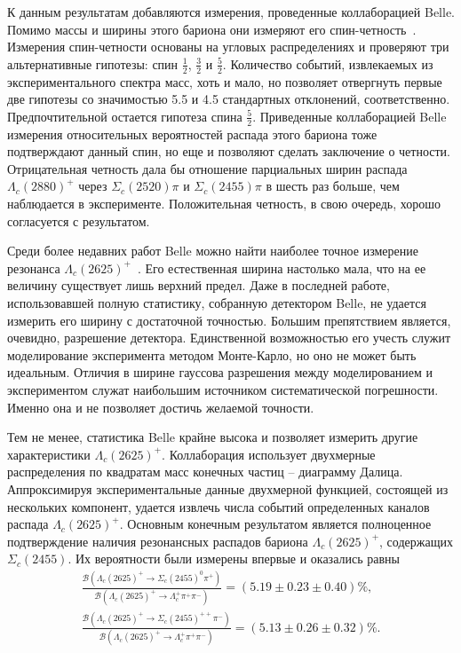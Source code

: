 \documentclass[a4paper, 12pt]{article}
\def\Lc{\Lambda_c^+}
\def\ScIz{\Sigma_c(2455)^0}
\def\ScIpp{\Sigma_c(2455)^{++}}
\def\ScI{\Sigma_c(2455)}
\def\ScII{\Sigma_c(2520)}
\def\LcII{\Lambda_c(2625)^+}
\def\LcIII{\Lambda_c(2880)^+}
\def\pip{\pi^+}
\def\pim{\pi^-}
\begin{document}
К данным результатам добавляются измерения, проведенные коллаборацией 
Belle. Помимо массы и ширины этого бариона они измеряют его 
спин-четность~\cite{4-belle-lc}. Измерения спин-четности основаны на 
угловых распределениях и проверяют три альтернативные гипотезы: спин 
$\frac{1}{2}$, $\frac{3}{2}$ и $\frac{5}{2}$. Количество событий, 
извлекаемых из экспериментального спектра масс, хоть и мало, но 
позволяет отвергнуть первые две гипотезы со значимостью 5.5 и 4.5 
стандартных отклонений, соответственно. Предпочтительной остается 
гипотеза спина $\frac{5}{2}$. Приведенные коллаборацией Belle измерения 
относительных вероятностей распада этого бариона тоже подтверждают 
данный спин, но еще и позволяют сделать заключение о четности. 
Отрицательная четность дала бы отношение парциальных ширин распада 
$\LcIII$ через $\ScII\pi$ и $\ScI\pi$ в шесть раз больше, чем 
наблюдается в эксперименте. Положительная четность, в свою очередь, 
хорошо согласуется с результатом.

Среди более недавних работ Belle можно найти наиболее точное измерение 
резонанса $\LcII$~\cite{5-belle-lc}. Его естественная ширина настолько 
мала, что на ее величину существует лишь верхний предел. Даже 
в последней работе, использовавшей полную статистику, собранную 
детектором Belle, не удается измерить его ширину с достаточной 
точностью. Большим препятствием является, очевидно, разрешение 
детектора. Единственной возможностью его учесть служит моделирование 
эксперимента методом Монте-Карло, но оно не может быть идеальным. 
Отличия в ширине гауссова разрешения между моделированием 
и экспериментом служат наибольшим источником систематической 
погрешности. Именно она и не позволяет достичь желаемой точности.

Тем не менее, статистика Belle крайне высока и позволяет измерить другие 
характеристики $\LcII$. Коллаборация использует двухмерные распределения 
по квадратам масс конечных частиц -- диаграмму Далица. Аппроксимируя 
экспериментальные данные двухмерной функцией, состоящей из нескольких 
компонент, удается извлечь числа событий определенных каналов распада 
$\LcII$. Основным конечным результатом является полноценное 
подтверждение наличия резонансных распадов бариона $\LcII$, содержащих 
$\ScI$. Их вероятности были измерены впервые и оказались равны
\[
  \begin{aligned}
    \frac{\mathcal{B}\left(\LcII\to\ScIz\pip\right)}
    {\mathcal{B}\left(\LcII\to\Lc\pip\pim\right)}
    = (5.19 \pm 0.23 \pm 0.40)\%, \\
    \frac{\mathcal{B}\left(\LcII\to\ScIpp\pim\right)}
    {\mathcal{B}\left(\LcII\to\Lc\pip\pim\right)}
    = (5.13 \pm 0.26 \pm 0.32)\%. \\
  \end{aligned}
\]
\end{document}
